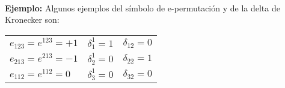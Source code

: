 \noindent{}
\\[1em]
\noindent
\textbf{Ejemplo: } Algunos ejemplos del símbolo de e-permutación y de la delta de Kronecker son:
\begin{table}[H]
\large
\centering
\begin{tabular}{l c c}
$e_{123} = e^{123} = +1$ & $\delta_{1}^{1} =  1$ & $\delta_{12} = 0$ \\
$e_{213} = e^{213} = -1$ & $\delta_{2}^{1} =  0$ & $\delta_{22} = 1$ \\
$e_{112} = e^{112} = 0$  & $\delta_{3}^{1} =  0$ & $\delta_{32} = 0$
\end{tabular}
\end{table}

